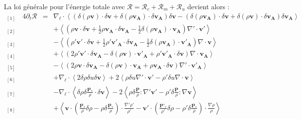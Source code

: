 La loi  générale pour l'énergie totale avec $\mathcal{R} = \mathcal{R}_{c} + \mathcal{R}_{m} + \mathcal{R}_{u}$ devient alors :
\begin{equation}
\label{eq:turb_cpg_khm} \boxed{
\begin{array}{lcl}
{}_{[1]} \quad 4\partial_t \mathcal{R} &=& \nabla_{\boldsymbol{\ell}} \cdot \left<\left(\delta \left(\rho\boldsymbol{v}\right) \cdot \delta \boldsymbol{v}+ \delta \left(\rho\boldsymbol{v_A}\right) \cdot \delta \boldsymbol{v_A} \right) \delta \boldsymbol{v}  -\left(\delta \left(\rho\boldsymbol{v_A}\right) \cdot \delta \boldsymbol{v}  + \delta \left(\rho\boldsymbol{v}\right) \cdot \delta \boldsymbol{v_A}  \right) \delta \boldsymbol{v_A} \right>\\
{}_{[2]} && +\left< \left(\rho \boldsymbol{v} \cdot \delta \boldsymbol{v} +\frac{1}{2} \rho \boldsymbol{v_A} \cdot  \delta \boldsymbol{v_A} -\frac{1}{2} \delta \left(\rho \boldsymbol{v_A}\right) \cdot \boldsymbol{v_A} \right) \nabla' \cdot \boldsymbol{v'} \right>\\
{}_{[3]} && -\left< \left(\rho' \boldsymbol{v'} \cdot \delta \boldsymbol{v}  + \frac{1}{2} \rho' \boldsymbol{v'_A} \cdot \delta \boldsymbol{v_A}  - \frac{1}{2} \delta \left(\rho \boldsymbol{v_A}\right) \cdot \boldsymbol{v'_A}  \right)\nabla \cdot \boldsymbol{v}\right>\\
{}_{[4]} &&+ \left<\left(2 \rho' \boldsymbol{v'} \cdot \delta \boldsymbol{v_A}- \delta \left(\rho \boldsymbol{v}\right) \cdot \boldsymbol{v'_A} + \rho' \boldsymbol{v'_A} \cdot \delta \boldsymbol{v}  \right)\nabla \cdot \boldsymbol{v_A}\right>\\
{}_{[5]} &&- \left<\left(2\rho \boldsymbol{v} \cdot \delta \boldsymbol{v_A} - \delta \left(\rho \boldsymbol{v}\right) \cdot \boldsymbol{v_A} +  \rho \boldsymbol{v_A} \cdot \delta \boldsymbol{v} \right)\nabla' \cdot \boldsymbol{v'_A}\right> \\
{}_{[6]} &&+ \nabla_{\boldsymbol{\ell}} \cdot \left< 2\delta \rho  \delta u \delta \boldsymbol{v}\right> + 2\left<\rho \delta u \nabla' \cdot \boldsymbol{v'}- \rho' \delta u \nabla \cdot \boldsymbol{v}\right>\\
{}_{[7]} &&- \nabla_{\boldsymbol{\ell}} \cdot \left<\delta \rho \delta \frac{ \overline{\boldsymbol{P_*}} }{\rho} \cdot \delta \boldsymbol{v} \right> - 2\left<\rho \delta \frac{ \overline{\boldsymbol{P}} }{\rho}:\nabla' \boldsymbol{v'} -  \rho' \delta \frac{ \overline{\boldsymbol{P}} }{\rho} :\nabla  \boldsymbol{v} \right>\\
{}_{[8]} && +  \left< \boldsymbol{v} \cdot \left(  \frac{ \overline{\boldsymbol{P_*}} }{\rho} \delta \rho - \rho \delta \frac{ \overline{\boldsymbol{P_*}} }{\rho}  \right)\cdot  \frac{\nabla' \rho'}{\rho'} - \boldsymbol{v'} \cdot \left(  \frac{ \overline{\boldsymbol{P'_*}} }{\rho'} \delta \rho - \rho' \delta \frac{ \overline{\boldsymbol{P_*}} }{\rho}  \right)\cdot  \frac{\nabla \rho}{\rho}  \right>\\

\end{array}}
\end{equation}
